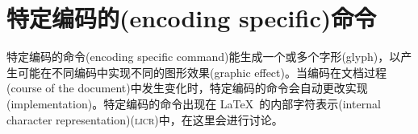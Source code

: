 \documentclass{ltxguide}[1994/11/20]
\begin{document}
\iffalse
\begin{center}\tiny
\mbox{\dolctable{0}{65}\vrule
\dolctable{65}{128}\vrule
\dolctable{128}{193}\vrule
\dolctable{193}{256}}
\end{center}
\fi



\section{特定编码的(encoding specific)命令}

特定编码的命令(encoding specific command)能生成一个或多个字形(glyph)，以产生可能在不同编码中实现不同的图形效果(graphic effect)。当编码在文档过程(course of the document)中发生变化时，特定编码的命令会自动更改实现(implementation)。特定编码的命令出现在 \LaTeX\ 的内部字符表示(internal character representation)(\textsc{licr})中，在\cite[第~7.11.2~节， 第~442~页]{A-W:MG2004}这里会进行讨论。
\end{document}
